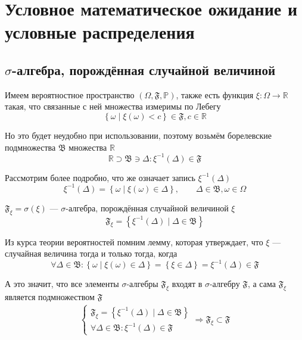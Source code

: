 \section{Условное математическое ожидание и условные распределения}
\subsection{$\sigma$-алгебра, порождённая случайной величиной}
Имеем вероятностное пространство
$\left( \Omega, \mathfrak{F}, \mathbb{P} \right)$,
также есть функция $\xi: \Omega\rightarrow\mathbb{R}$
такая, что связанные с ней множества измеримы по Лебегу
$$\left\{\omega
    \mid \xi\left(\omega\right) < c\right\} \in \mathfrak{F}, c\in \mathbb{R}$$

Но это будет неудобно при использовании,
поэтому возьмём борелевские подмножества $\mathfrak{B}$ множества $\mathbb{R}$
$$\mathbb{R}\supset\mathfrak{B}\ni\Delta:
    \xi^{-1}\left( \Delta \right) \in \mathfrak{F}$$

Рассмотрим более подробно,
что же означает запись $\xi^{-1}\left( \Delta \right)$
$$\xi^{-1}\left( \Delta \right)
    = \left\{ \omega \mid \xi\left( \omega \right) \in \Delta \right\},
    \qquad \Delta\in\mathfrak{B}, \omega\in\Omega$$

\begin{definition}
    $\mathfrak{F}_\xi = \sigma\left( \xi \right)$
    --- $\sigma$-алгебра, порождённая случайной величиной $\xi$
    $$\mathfrak{F}_\xi
        =\left\{ \xi^{-1}\left( \Delta \right)
            \mid \Delta\in\mathfrak{B} \right\}$$
\end{definition}

Из курса теории вероятностей помним лемму, которая утверждает,
что $\xi$ --- случайная величина тогда и только тогда, когда
$$\forall\Delta\in\mathfrak{B}:
    \left\{ \omega \mid \xi\left( \omega \right) \in \Delta \right\}
    = \left\{ \xi\in\Delta \right\}
    = \xi^{-1}\left( \Delta \right) \in \mathfrak{F}$$

А это значит, что все элементы $\sigma$-алгебры $\mathfrak{F}_\xi$
входят в $\sigma$-алгебру $\mathfrak{F}$, а сама $\mathfrak{F}_\xi$
является подмножеством $\mathfrak{F}$
\begin{align*}
    \begin{cases}
        \mathfrak{F}_\xi
            = \left\{ \xi^{-1}\left( \Delta \right)
                \mid \Delta\in\mathfrak{B} \right\}\\
        \forall\Delta\in\mathfrak{B}:
            \xi^{-1}\left( \Delta \right) \in \mathfrak{F}
    \end{cases}
    \Rightarrow
    \mathfrak{F}_\xi \subset \mathfrak{F}
\end{align*}

